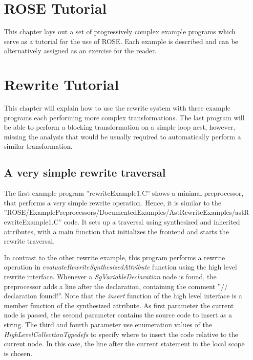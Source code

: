 \chapter{ROSE Tutorial}

\label{RoseExamples:RoseTutorial}

    This chapter lays out a set of progressively
complex example programs which serve as a tutorial for the use of ROSE.
Each example is described and can be alternatively assigned as
an exercise for the reader.




\chapter{Rewrite Tutorial}
\label{RoseExamples:RewriteTutorial}

This chapter will explain how to use the rewrite system with three 
example programs each performing more complex transformations. The 
last program will be able to
perform a blocking transformation on a simple loop nest, however, missing
the analysis that would be usually required to automatically perform a
similar transformation.

\section{A very simple rewrite traversal}

The first example program ''rewriteExample1.C'' shows a minimal preprocessor, that
performs a very simple rewrite operation. Hence, it is similar to the 
''ROSE/ExamplePreprocessors/DocumentedExamples/AstRewriteExamples/astRewriteExample1.C'' code. It 
sets up a traversal using synthesized and inherited attributes, with a main function
that initializes the frontend and starts the rewrite traversal.

In contrast to the other rewrite example, this program performs a rewrite operation
in \emph{evaluateRewriteSynthesizedAttribute} function using the high level rewrite interface. 
Whenever a \emph{SgVariableDeclaration}
node is found, the preprocessor adds a line after the declaration, containing the comment
''// declaration found!''. Note that the \emph{insert} function of the high level interface
is a member function of the synthesized attribute. As first parameter the current node is
passed, the second parameter contains the source code to insert as a string. The third 
and fourth parameter use enumeration values of the \emph{HighLevelCollectionTypedefs}
to specify where to insert the code relative to the current node. In this case, the line
after the current statement in the local scope is chosen.

